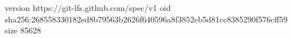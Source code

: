 version https://git-lfs.github.com/spec/v1
oid sha256:268558330182ed8b79563b2626f640596a8f3852eb5d81cc8385290f576cff59
size 85628
